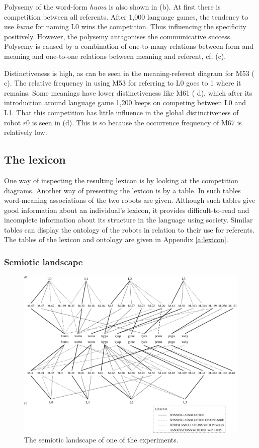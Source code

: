 Polysemy of the word-form {\it huma} is also shown in  (b). At first there is competition between all referents. After 1,000 language games, the tendency to use {\it huma} for naming L0 wins the competition. Thus influencing the specificity positively. However, the polysemy antagonises the communicative success. Polysemy is caused by a combination of one-to-many relations between form and meaning and one-to-one relations between meaning and referent, cf.  (c).

Distinctiveness is high, as can be seen in the meaning-referent diagram for M53 ( c). The relative frequency in using M53 for referring to L0 goes to 1 where it remains. Some meanings have lower distinctiveness like M61 ( d), which after its introduction around language game 1,200 keeps on competing between L0 and L1. That this competition has little influence in the global distinctiveness of robot $r0$ is seen in  (d). This is so because the occurrence frequency of M67 is relatively low.

\subsection{The lexicon}

One way of inspecting the resulting lexicon is by looking at the competition diagrams. Another way of presenting the lexicon is by a table. In such tables word-meaning associations of the two robots are given. Although such tables give good information about an individual's lexicon, it provides difficult-to-read and incomplete information about its structure in the language using society. Similar tables can display the ontology of the robots in relation to their use for referents. The tables of the lexicon and ontology are given in Appendix \ref{a:lexicon}.

\subsubsection{Semiotic landscape}

\begin{figure}[t]
\centerline{\includegraphics[width=12cm]{basic/semiotic.eps}}
\caption{The semiotic landscape of one of the experiments.}
\label{f:st:semiotic}
\end{figure}

